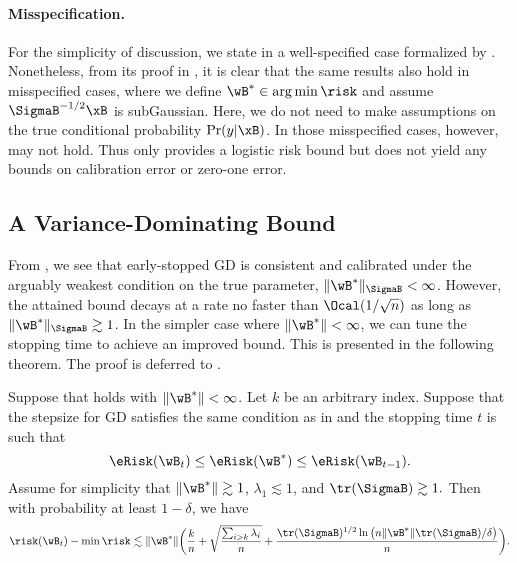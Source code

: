 \documentclass[11pt]{article}
\begin{document}
\paragraph{Misspecification.}
For the simplicity of discussion, we state  in a well-specified case formalized by . Nonetheless, from its proof in , it is clear that the same results also hold in misspecified cases, where we define $\wB^* \in \arg\min \risk$ and assume $\SigmaB^{-1/2}\xB$ is subGaussian.
Here, we do not need to make assumptions on the true conditional probability $\Pr(y|\xB)$.
In those misspecified cases, however,  may not hold. Thus  only provides a logistic risk bound but does not yield any bounds on calibration error or zero-one error.



\subsection{A Variance-Dominating Bound}
From , we see that early-stopped GD is consistent and calibrated under the arguably weakest condition on the true parameter, $\|\wB^*\|_{\SigmaB} < \infty$. However, the attained bound decays at a rate no faster than $\Ocal(1/\sqrt{n})$ as long as $\|\wB^*\|_{\SigmaB} \gtrsim 1$.
In the simpler case where $\|\wB^*\|< \infty$, 
we can tune the stopping time to achieve an improved bound. This is presented in the following theorem. The proof is deferred to .

\begin{theorem}\label{thm:gd:fast-upper-bound}
Suppose that  holds with $\|\wB^*\|<\infty$.
Let $k$ be an arbitrary index.
Suppose that the stepsize for GD satisfies the same condition as in  and the stopping time $t$ is such that
\[\eRisk(\wB_t) \le \eRisk(\wB^*) \le \eRisk(\wB_{t-1}).\]
Assume for simplicity that 
\(\|\wB^*\|\gtrsim 1\), \(\lambda_1 \lesssim 1\), and \(\tr(\SigmaB)\gtrsim 1.\)
Then with probability at least $1-\delta$, we have 
\begin{align*}
\risk (\wB_t) -  \min\risk \lesssim  \|\wB^*\| \bigg( \frac{k}{n} + \sqrt{\frac{\sum_{i>k}\lambda_i}{n}} +
 \frac{  \tr(\SigmaB)^{1/2}\ln\big(n \|\wB^*\|\tr(\SigmaB) /\delta\big)}{n} \bigg).
\end{align*}
\end{theorem}
\end{document}
